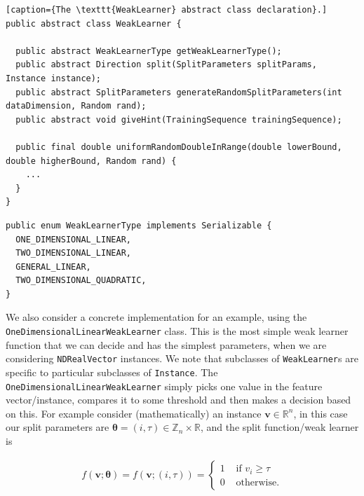 \documentclass[12pt,twoside,notitlepage]{report}
\newcommand{\vc}[1]{\mathbf{#1}}
\newcommand{\bb}[1]{\mathbb{#1}}
\begin{document}
                \begin{lstlisting}[caption={The \texttt{WeakLearner} abstract class declaration}.]
public abstract class WeakLearner {

  public abstract WeakLearnerType getWeakLearnerType();
  public abstract Direction split(SplitParameters splitParams, Instance instance);
  public abstract SplitParameters generateRandomSplitParameters(int dataDimension, Random rand);
  public abstract void giveHint(TrainingSequence trainingSequence);

  public final double uniformRandomDoubleInRange(double lowerBound, double higherBound, Random rand) {
    ...
  }
}
                \end{lstlisting}

                \begin{lstlisting}[caption={The \texttt{WeakLearnerType} enum, used to identify particular weak learners.},
                label={lst:WeakLearnerType}]
public enum WeakLearnerType implements Serializable {
  ONE_DIMENSIONAL_LINEAR,
  TWO_DIMENSIONAL_LINEAR,
  GENERAL_LINEAR,
  TWO_DIMENSIONAL_QUADRATIC,
}
                \end{lstlisting}

                We also consider a concrete implementation for an example, using the \texttt{OneDimensionalLinearWeakLearner} 
                class. This is the most simple weak learner function that we can decide and has the simplest parameters, 
                when we are considering \texttt{NDRealVector} instances. We note that subclasses of \texttt{WeakLearner}s are
                specific to particular subclasses of \texttt{Instance}. 
                The \texttt{OneDimensionalLinearWeakLearner} simply picks one value in the feature vector/instance, compares 
                it to some threshold and then makes a decision based on this. For example consider (mathematically) an 
                instance $\vc{v} \in \bb{R}^n$, in this case our split parameters are $\vc{\theta} = (i,\tau) \in 
                \bb{Z}_n \times \bb{R}$, and the split function/weak learner is

                \begin{align}
                  f(\vc{v}; \vc{\theta}) = f(\vc{v}; (i,\tau)) = \begin{cases}
                    1 & \text{ if } v_i \geq \tau \\
                    0 & \text{ otherwise.}
                  \end{cases}
                  \label{eq:split_equation}
                \end{align}
\end{document}
